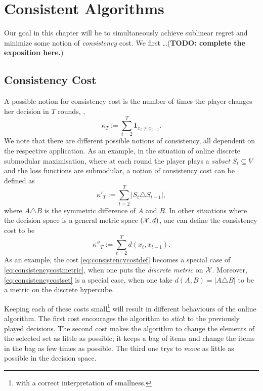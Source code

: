 \chapter{Consistent Algorithms}
Our goal in this chapter will be to simultaneously achieve sublinear regret and minimize some notion of {\em consistency} cost. We first \dots (\textbf{TODO: complete the exposition here.})

\section{Consistency Cost}
A possible notion for consistency cost is the number of times the player changes her decision in $T$ rounds, \ie,
\begin{equation}\label{eq:consistencycostdef}
    \kappa_T := \sum_{t = 2}^T \mathbf{1}_{x_{t} \not= x_{t - 1}}.
\end{equation}
We note that there are different possible notions of consistency, all dependent on the respective application. As an example, in the situation of online discrete submodular maximisation, where at each round the player plays a \emph{subset} $S_t \subseteq V$ and the loss functions are submodular, a notion of consistency cost can be defined as 
\begin{equation}\label{eq:consistencycostset}
    \kappa'_T := \sum_{t=2}^T |S_t \triangle S_{t-1}|,
\end{equation}
where $A\triangle B$ is the symmetric difference of $A$ and $B$. In other situations where the decision space is a general metric space $(\mathcal{X}, d)$, one can define the consistency cost to be
\begin{equation}\label{eq:consistencycostmetric}
    \kappa''_T := \sum_{t=2}^T d(x_t, x_{t-1}).
\end{equation}
As an example, the cost \eqref{eq:consistencycostdef} becomes a special case of \eqref{eq:consistencycostmetric}, when one puts the \emph{discrete metric} on $\mathcal{X}$. Moreover, \eqref{eq:consistencycostset} is a special case, when one take $d(A, B) = |A\triangle B|$ to be a metric on the discrete hypercube.

Keeping each of these costs small\footnote{with a correct interpretation of smallness.} will result in different behaviours of the online algorithm. The first cost encourages the algorithm to \emph{stick} to the previously played decisions. The second cost makes the algorithm to change the elements of the selected set as little as possible; it keeps a bag of items and change the items in the bag as few times as possible. The third one trys to \emph{move} as little as possible in the decision space.

